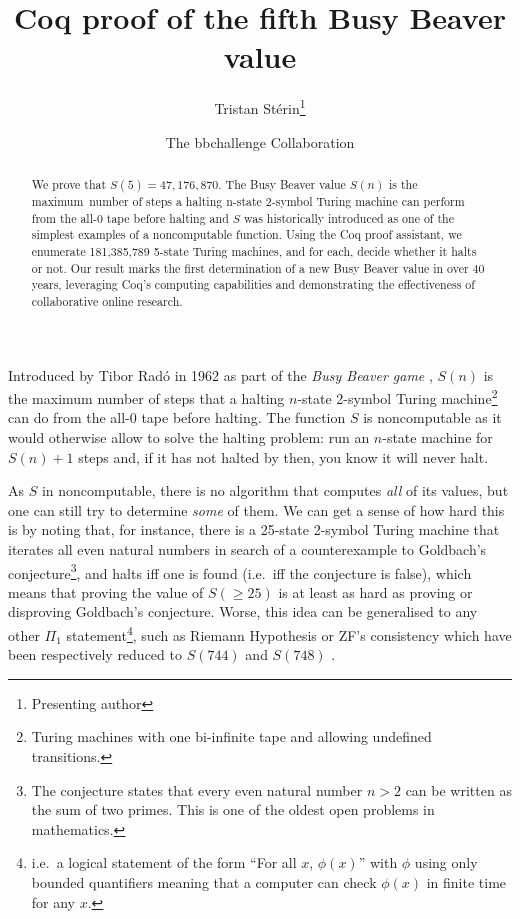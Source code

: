 \documentclass{easychair}
\title{
  \vspace{-1em}  
Coq proof of the fifth Busy Beaver value}
\author{
  Tristan Stérin\thanks{Presenting author}\inst{~1,2} \and The bbchallenge Collaboration\inst{1}
}
\institute{
  bbchallenge.org,
   \email{bbchallenge@bbchallenge.org}
\and
prgm.dev,
  Paris, France
  \email{tristan@prgm.dev}\\
 }
\newcommand{\radofull}{Tibor Rad\'o\xspace}
\theoremstyle{definition} %
\numberwithin{equation}{section}
\theoremstyle{definition} %
\begin{document}
\maketitle
\vspace{-1em}
\begin{abstract}
  We prove that $S(5) = 47,176,870$. The Busy Beaver value $S(n)$ is the maximum~number of steps a halting n-state 2-symbol Turing machine can perform from the all-0 tape before halting and $S$ was historically introduced as one of the simplest examples of a noncomputable function.  Using the Coq proof assistant, we enumerate 181,385,789 5-state Turing machines, and for each, decide whether it halts or not. 
  Our result marks the first determination of a new Busy Beaver value in over 40 years, leveraging Coq's computing capabilities and demonstrating the effectiveness of collaborative online research.
\end{abstract}
\newcommand{\ie}{i.e.~}
\newcommand{\eg}{e.g.~}

\newcommand{\noncomput}{noncomputable\xspace}
\newcommand{\BBfull}{Busy Beaver\xspace}
\newcommand{\Coq}{Coq\xspace}
\newcommand{\CoqProofReleaseURL}{\url{https://github.com/ccz181078/Coq-BB5}}


Introduced by \radofull in 1962 as part of the \textit{Busy Beaver game} \cite{Rado_1962}, $S(n)$ is the maximum number of steps that a halting $n$-state 2-symbol Turing machine\footnote{Turing machines with one bi-infinite tape and allowing undefined transitions.} can do from the all-0 tape before halting. The function $S$ is noncomputable as it would otherwise allow to solve the 
halting problem: run an $n$-state machine for $S(n)+1$ steps and, if it has not halted by then, you know it will never halt.

As $S$ in noncomputable, there is no algorithm that computes \textit{all} of its values, but one can still try to determine \textit{some} of them. We can get a sense of how hard this is by noting that, for instance, there is a 25-state 2-symbol Turing machine \cite{GoldbachTM27,GoldbachTM25} that iterates all even natural numbers in search of a counterexample to Goldbach's conjecture\footnote{The conjecture states that every even natural number $n>2$ can be written as the sum of two primes. This is one of the oldest open problems in mathematics.}, and halts iff one is found (\ie iff the conjecture is false), which means that proving the value of $S(\geq 25)$ is at least as hard as proving or disproving Goldbach's conjecture. Worse, this idea can be generalised to any other $\Pi_1$ statement\footnote{\ie a logical statement of the form ``For all $x$, $\phi(x)$'' with $\phi$ using only bounded quantifiers meaning that a computer can check $\phi(x)$ in finite time for any $x$.}, such as Riemann Hypothesis or ZF's consistency which have been respectively reduced to $S(744)$ and $S(748)$ \cite{RiemannTM,Yedidia2016,ZFTM,Yedidia2016,BusyBeaverFrontier,BB748Thesis}. 
\end{document}
